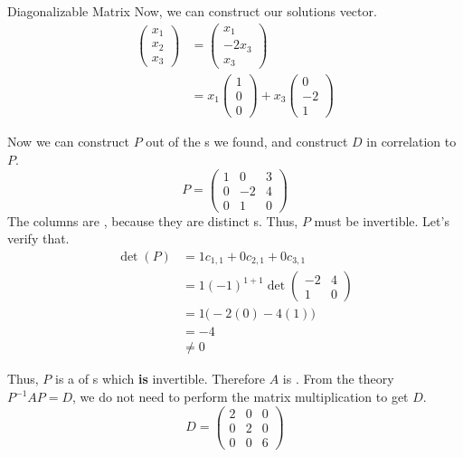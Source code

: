 \begin{example}{Diagonalizable Matrix}
  Now, we can construct our solutions vector.
  \begin{align*}
    \begin{pmatrix}
      x_{1} \\ x_{2} \\ x_{3}
    \end{pmatrix} &=
                    \begin{pmatrix}
                      x_{1} \\ -2x_{3} \\ x_{3}
                    \end{pmatrix} \\
    &= x_{1}
      \begin{pmatrix}
        1 \\ 0 \\ 0
      \end{pmatrix} + x_{3}
    \begin{pmatrix}
      0 \\ -2 \\ 1
    \end{pmatrix}
  \end{align*}

  Now we can construct $P$ out of the s we found, and construct $D$ in correlation to $P$.
  \begin{equation*}
    P =
    \begin{pmatrix}
      1 & 0 & 3 \\
      0 & -2 & 4 \\
      0 & 1 & 0
    \end{pmatrix}
  \end{equation*}
  The columns are , because they are distinct s.
  Thus, $P$ must be invertible.
  Let's verify that.
  \begin{align*}
    \det(P) &= 1 c_{1,1} + 0 c_{2,1} + 0 c_{3,1} \\
    &= 1 {(-1)}^{1+1} \det
      \begin{pmatrix}
        -2 & 4 \\
        1 & 0
      \end{pmatrix} \\
            &= 1 \bigl( -2 (0) - 4 (1) \bigr) \\
            &= -4 \\
            &\neq 0
  \end{align*}

  Thus, $P$ is a  of s which \textbf{is} invertible.
  Therefore $A$ is .
  From the theory $P^{-1}AP=D$, we do not need to perform the matrix multiplication to get $D$.
  \begin{equation*}
    D =
    \begin{pmatrix}
      2 & 0 & 0 \\
      0 & 2 & 0 \\
      0 & 0 & 6
    \end{pmatrix}
  \end{equation*}
\end{example}



